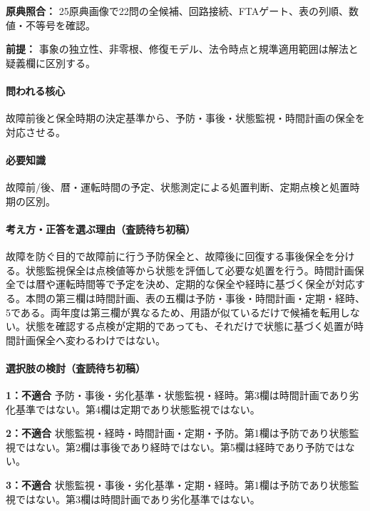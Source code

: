 \noindent\textbf{原典照合：} 25原典画像で22問の全候補、回路接続、FTAゲート、表の列順、数値・不等号を確認。\par

\noindent\textbf{前提：} 事象の独立性、非零根、修復モデル、法令時点と規準適用範囲は解法と疑義欄に区別する。\par

\paragraph{問われる核心} 故障前後と保全時期の決定基準から、予防・事後・状態監視・時間計画の保全を対応させる。

\paragraph{必要知識} 故障前/後、暦・運転時間の予定、状態測定による処置判断、定期点検と処置時期の区別。

\paragraph{考え方・正答を選ぶ理由（査読待ち初稿）} 故障を防ぐ目的で故障前に行う予防保全と、故障後に回復する事後保全を分ける。状態監視保全は点検値等から状態を評価して必要な処置を行う。時間計画保全では暦や運転時間等で予定を決め、定期的な保全や経時に基づく保全が対応する。本問の第三欄は時間計画、表の五欄は予防・事後・時間計画・定期・経時、5である。両年度は第三欄が異なるため、用語が似ているだけで候補を転用しない。状態を確認する点検が定期的であっても、それだけで状態に基づく処置が時間計画保全へ変わるわけではない。

\paragraph{選択肢の検討（査読待ち初稿）}\mbox{}\par

\noindent\textbf{1：不適合} 予防・事後・劣化基準・状態監視・経時。第3欄は時間計画であり劣化基準ではない。第4欄は定期であり状態監視ではない。\par

\noindent\textbf{2：不適合} 状態監視・経時・時間計画・定期・予防。第1欄は予防であり状態監視ではない。第2欄は事後であり経時ではない。第5欄は経時であり予防ではない。\par

\noindent\textbf{3：不適合} 状態監視・事後・劣化基準・定期・経時。第1欄は予防であり状態監視ではない。第3欄は時間計画であり劣化基準ではない。\par

